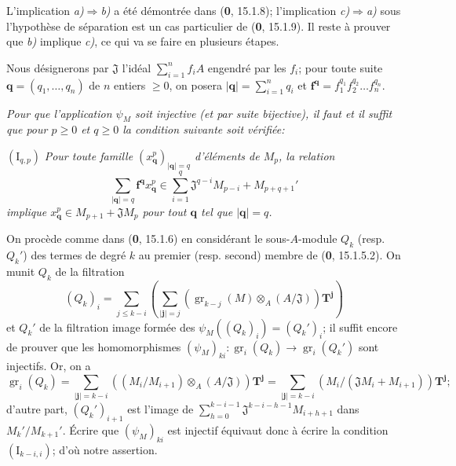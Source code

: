 L'implication \emph{a)}$\Rightarrow$\emph{b)} a été démontrée dans (\textbf{0}, 15.1.8); l'implication \emph{c)}$\Rightarrow$\emph{a)} sous l'hypothèse de séparation est un cas particulier de (\textbf{0}, 15.1.9). Il reste à prouver que \emph{b)} implique \emph{c)}, ce qui va se faire en plusieurs étapes.

Nous désignerons par $\mathfrak J$ l'idéal $\sum_{i=1}^n f_iA$ engendré par les $f_i$; pour toute suite $\mathbf q=(q_1,\ldots,q_n)$ de $n$ entiers $\geq0$, on posera $|\mathbf q|=\sum_{i=1}^nq_i$ et $\mathbf f^{\mathbf q}=f_1^{q_1}f_2^{q_2}\ldots f_n^{q_n}$.

\begin{env}[19.5.5.1]
\label{IV.19.5.5.1}
\emph{Pour que l'application $\psi_M$ soit injective (et par suite bijective), il faut et il suffit que pour $p\geq0$ et $q\geq0$ la condition suivante soit vérifiée:}

$(\mathrm I_{q,p})$ \emph{Pour toute famille $(x_{\mathbf q}^p)_{|\mathbf q|=q}$ d'éléments de $M_p$, la relation}
\[
  \sum_{|\mathbf q|=q}\mathbf f^{\mathbf q}x_{\mathbf q}^p\in\sum_{i=1}^q\mathfrak J^{q-i}M_{p-i}+M_{p+q+1}'
\]
\emph{implique $x_{\mathbf q}^p\in M_{p+1}+\mathfrak JM_p$ pour tout $\mathbf q$ tel que $|\mathbf q|=q$.}

On procède comme dans (\textbf{0}, 15.1.6) en considérant le sous-$A$-module $Q_k$ (resp. $Q_k'$) des termes de degré $k$ au premier (resp. second) membre de (\textbf{0}, 15.1.5.2). On munit $Q_k$ de la filtration
\[
  (Q_k)_i=\sum_{j\leq k-i}\left(\sum_{|\mathbf j|=j}(\operatorname{gr}_{k-j}(M)\otimes_A(A/\mathfrak J))\mathbf T^{\mathbf j}\right)
\]
et $Q_k'$ de la filtration image formée des $\psi_M((Q_k)_i)=(Q_k')_i$; il suffit encore de prouver que les homomorphismes $(\psi_M)_{ki}:\operatorname{gr}_i(Q_k)\to\operatorname{gr}_i(Q_k')$ sont injectifs. Or, on a
\[
  \operatorname{gr}_i(Q_k)=\sum_{|\mathbf j|=k-i}((M_i/M_{i+1})\otimes_A(A/\mathfrak J))\mathbf T^{\mathbf j}
  =\sum_{|\mathbf j|=k-i}(M_i/(\mathfrak JM_i+M_{i+1}))\mathbf T^{\mathbf j};
\]
d'autre part, $(Q_k')_{i+1}$ est l'image de $\sum_{h=0}^{k-i-1}\mathfrak J^{k-i-h-1}M_{i+h+1}$ dans $M_k'/M_{k+1}'$. Écrire que $(\psi_M)_{ki}$ est injectif équivaut donc à écrire la condition $(\mathrm I_{k-i,i})$; d'où notre assertion.
\end{env}

